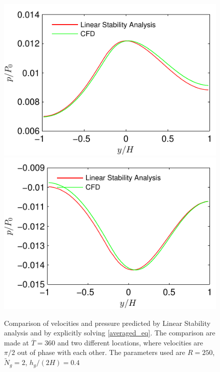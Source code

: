 \documentclass[12pt]{report}   %
\newcommand{\Ndg}{\tilde{N}_g}
\renewcommand{\bar}{\overline}
\begin{document}
\begin{figure}
\centerline{\includegraphics{LinearStabilityVsCFD_p_phase0} \includegraphics{LinearStabilityVsCFD_p_phase90}}
\caption{Comparison of velocities and pressure predicted by Linear Stability analysis and by explicitly solving \eqref{averaged_eq}. The comparison are made at $\bar{T}=360$ and two different locations, where velocities are $\pi/2$ out of phase with each other. The parameters used are $R=250$, $\Ndg=2$, $h_g/(2H)=0.4$  }
\label{CFD_vs_LinearStability_AllVariables}
\end{figure}
\clearpage{\pagestyle{empty}\cleardoublepage}
\end{document}
